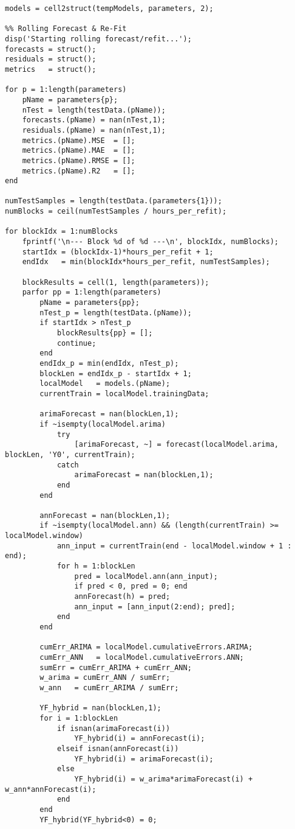 \begin{verbatim}
models = cell2struct(tempModels, parameters, 2);

%% Rolling Forecast & Re-Fit
disp('Starting rolling forecast/refit...');
forecasts = struct(); 
residuals = struct(); 
metrics   = struct();

for p = 1:length(parameters)
    pName = parameters{p};
    nTest = length(testData.(pName));
    forecasts.(pName) = nan(nTest,1);
    residuals.(pName) = nan(nTest,1);
    metrics.(pName).MSE  = [];
    metrics.(pName).MAE  = [];
    metrics.(pName).RMSE = [];
    metrics.(pName).R2   = [];
end

numTestSamples = length(testData.(parameters{1}));
numBlocks = ceil(numTestSamples / hours_per_refit);

for blockIdx = 1:numBlocks
    fprintf('\n--- Block %d of %d ---\n', blockIdx, numBlocks);
    startIdx = (blockIdx-1)*hours_per_refit + 1;
    endIdx   = min(blockIdx*hours_per_refit, numTestSamples);

    blockResults = cell(1, length(parameters));
    parfor pp = 1:length(parameters)
        pName = parameters{pp};
        nTest_p = length(testData.(pName));
        if startIdx > nTest_p
            blockResults{pp} = [];
            continue;
        end
        endIdx_p = min(endIdx, nTest_p);
        blockLen = endIdx_p - startIdx + 1;
        localModel   = models.(pName);
        currentTrain = localModel.trainingData;

        arimaForecast = nan(blockLen,1);
        if ~isempty(localModel.arima)
            try
                [arimaForecast, ~] = forecast(localModel.arima, blockLen, 'Y0', currentTrain);
            catch
                arimaForecast = nan(blockLen,1);
            end
        end

        annForecast = nan(blockLen,1);
        if ~isempty(localModel.ann) && (length(currentTrain) >= localModel.window)
            ann_input = currentTrain(end - localModel.window + 1 : end);
            for h = 1:blockLen
                pred = localModel.ann(ann_input);
                if pred < 0, pred = 0; end
                annForecast(h) = pred;
                ann_input = [ann_input(2:end); pred];
            end
        end

        cumErr_ARIMA = localModel.cumulativeErrors.ARIMA;
        cumErr_ANN   = localModel.cumulativeErrors.ANN;
        sumErr = cumErr_ARIMA + cumErr_ANN;
        w_arima = cumErr_ANN / sumErr;
        w_ann   = cumErr_ARIMA / sumErr;

        YF_hybrid = nan(blockLen,1);
        for i = 1:blockLen
            if isnan(arimaForecast(i))
                YF_hybrid(i) = annForecast(i);
            elseif isnan(annForecast(i))
                YF_hybrid(i) = arimaForecast(i);
            else
                YF_hybrid(i) = w_arima*arimaForecast(i) + w_ann*annForecast(i);
            end
        end
        YF_hybrid(YF_hybrid<0) = 0;


\end{verbatim}
